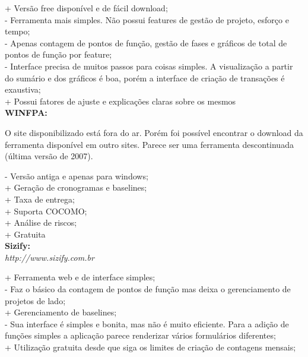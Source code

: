 \begin{apendicesenv}
\noindent + Versão free disponível e de fácil download;\\
- Ferramenta mais simples. Não possui features de gestão de projeto, esforço e tempo;\\
- Apenas contagem de pontos de função, gestão de fases e gráficos de total de pontos de função por feature;\\
- Interface precisa de muitos passos para coisas simples. A visualização a partir do sumário e dos gráficos é boa, porém a interface de criação de transações é exaustiva;\\
+ Possui fatores de ajuste e explicações claras sobre os mesmos\\

\noindent\textbf{WINFPA:}

O site disponibilizado está fora do ar. Porém foi possível encontrar o download da ferramenta disponível em outro sites. Parece ser uma ferramenta descontinuada (última versão de 2007).

\noindent- Versão antiga e apenas para windows;\\
+ Geração de cronogramas e baselines;\\
+ Taxa de entrega;\\
+ Suporta COCOMO;\\
+ Análise de riscos;\\
+ Gratuita\\

\noindent\textbf{Sizify:}\\
\textit{http://www.sizify.com.br}


\noindent + Ferramenta web e de interface simples;\\
- Faz o básico da contagem de pontos de função mas deixa o gerenciamento de projetos de lado;\\
+ Gerenciamento de baselines;\\
- Sua interface é simples e bonita, mas não é muito eficiente. Para a adição de funções simples a aplicação parece renderizar vários formulários diferentes;\\
+ Utilização gratuita desde que siga os limites de criação de contagens mensais;

\end{apendicesenv}
